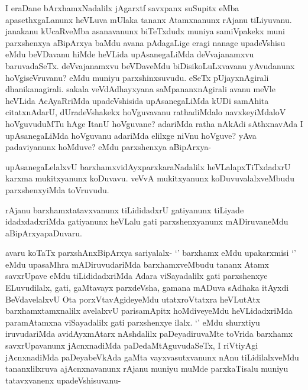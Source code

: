 \begin{artha}
I eraDane bArxhamxNadalilx jAgarxtf savxpanx suSupitx eMba apasethxgaLanunx heVLuva mUlaka tananx Atamxnanunx rAjanu tiLiyuvanu. janakanu kUcaRveMba asanavanunx biTeTxdudx muniya samiVpakekx muni parxshenxya aBipArxya baMdu avana pAdagaLige eragi nanage upadeVshisu eMdu beVDavanu hiMde heVLida upAsanegaLiMda deVvajanamxvu baruvadaSeTx. deVvajanamxvu beVDaveMdu biDisikoLuLxvavanu yAvudanunx hoVgiseVruvanu? eMdu muniyu parxshinxsuvudu. eSeTx pUjayxnAgirali dhanikanagirali. sakala veVdAdhayxyana saMpananxnAgirali avanu meVle heVLida AcAyaRriMda upadeVshisida upAsanegaLiMda kUDi samAhita citatxnAdarU, dUradeVshakekx hoVguvavanu rathadiMdalo navxkeyiMdaloV hoVguvuduMTu hAge ItanU hoVguvane? adariMda ratha nAkAdi sAthxnavAda I upAsanegaLiMda hoVguvanu adariMda elilxge niVnu hoVguve? yAva padaviyanunx hoMduve? eMdu parxshenxya aBipArxya-
\end{artha}%

\begin{artha}
upAsanegaLelalxvU barxhamxvidAyxparxkaraNadalilx heVLalapxTiTxdadxrU karxma mukitxyanunx koDuvavu. veVvA mukitxyanunx koDuvuvalalxveMbudu parxshenxyiMda toVruvudu. 
\end{artha}


\begin{artha}
rAjanu barxhamxtatavxvanunx tiLididadxrU gatiyanunx tiLiyade idadxdadxriMda gatiyanunx heVLalu gati parxshenxyanunx mADiruvaneMdu aBipArxyapaDuvaru. 
\end{artha}

\begin{artha}
avaru koTaTx parxshAnxBipArxya sariyalalx- `\stext ' barxhamx eMdu upakarxmisi `\stext ' eMdu upasaMhra mADiruvudariMda barxhamxveMbudu tananx Atamx savxrUpave eMdu tiLididadxriMda Adara viSayadalilx gati parxshenxye ELuvudilalx, gati, gaMtavayx parxdeVsha, gamana mADuva sAdhaka itAyxdi BeVdavelalxvU Ota porxVtavAgideyeMdu utatxroVtatxra heVLutAtx barxhamxtamxnalilx avelalxvU parisamApitx hoMdiveyeMdu heVLidadxriMda paramAtamxna viSayadalilx gati parxshenxye ilalx. `\stext ' eMdu shurxtiyu iruvudariMda avidAyxmAtarx nAshdalilx paDeyadiruvaMte toVrida barxhamx savxrUpavanunx jAcnxnadiMda paDedaMtAguvudaSeTx, I riVtiyAgi jAcnxnadiMda paDeyabeVkAda gaMta vayxvasutxvanunx nAnu tiLidilalxveMdu tananxlilxruva ajAcnxnavanunx rAjanu muniyu muMde parxkaTisalu muniyu tatavxvanenx upadeVshisuvanu-
\end{artha}

